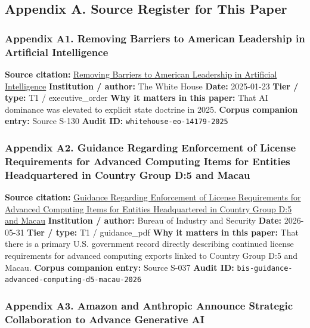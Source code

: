 \documentclass[
  american,
  11pt,
  letterpaper,
]{article}
\begin{document}
\subsection{Appendix A. Source Register for This
Paper}\label{appendix-a.-source-register-for-this-paper}

\subsubsection{Appendix A1. Removing Barriers to American Leadership in
Artificial
Intelligence}\label{appendix-a1-removing-barriers-to-american-leadership-in-artificial-intelligence}

\textbf{Source citation:}
\href{https://www.whitehouse.gov/presidential-actions/2025/01/removing-barriers-to-american-leadership-in-artificial-intelligence/}{Removing
Barriers to American Leadership in Artificial Intelligence}
\textbf{Institution / author:} The White House \textbf{Date:} 2025-01-23
\textbf{Tier / type:} T1 / executive\_order \textbf{Why it matters in
this paper:} That AI dominance was elevated to explicit state doctrine
in 2025. \textbf{Corpus companion entry:} Source S-130 \textbf{Audit
ID:} \texttt{whitehouse-eo-14179-2025}

\subsubsection{Appendix A2. Guidance Regarding Enforcement of License
Requirements for Advanced Computing Items for Entities Headquartered in
Country Group D:5 and
Macau}\label{appendix-a2-guidance-regarding-enforcement-of-license-requirements-for-advanced-computing-items-for-entities-headquartered-in-country-group-d-5-and-macau}

\textbf{Source citation:}
\href{https://www.bis.gov/media/documents/bis-guidance-may-31-2026.pdf}{Guidance
Regarding Enforcement of License Requirements for Advanced Computing
Items for Entities Headquartered in Country Group D:5 and Macau}
\textbf{Institution / author:} Bureau of Industry and Security
\textbf{Date:} 2026-05-31 \textbf{Tier / type:} T1 / guidance\_pdf
\textbf{Why it matters in this paper:} That there is a primary U.S.
government record directly describing continued license requirements for
advanced computing exports linked to Country Group D:5 and Macau.
\textbf{Corpus companion entry:} Source S-037 \textbf{Audit ID:}
\texttt{bis-guidance-advanced-computing-d5-macau-2026}

\subsubsection{Appendix A3. Amazon and Anthropic Announce Strategic
Collaboration to Advance Generative
AI}\label{appendix-a3-amazon-and-anthropic-announce-strategic-collaboration-to-advance-generative-ai}
\end{document}
